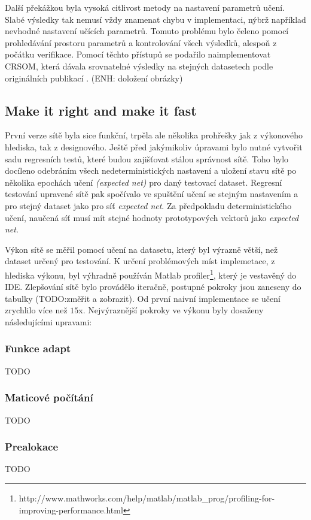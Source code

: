 \documentclass[thesis=M,czech]{FITthesis}[2012/06/26]
\begin{document}
Další překážkou byla vysoká citlivost metody na nastavení parametrů učení\cite{hartono14}. Slabé výsledky tak nemusí vždy znamenat chybu v implementaci, nýbrž například nevhodné nastavení učících parametrů. Tomuto problému bylo čeleno pomocí prohledávání prostoru parametrů a kontrolování všech výsledků, alespoň z počátku verifikace.
Pomocí těchto přístupů se podařilo naimplementovat CRSOM, která dávala srovnatelné výsledky na stejných datasetech podle originálních publikací \cite{hartono14}. (ENH: doložení obrázky)

\subsection{Make it right and make it fast}

První verze sítě byla sice funkční, trpěla ale několika prohřešky jak z výkonového hlediska, tak z designového. Ještě před jakýmikoliv úpravami bylo nutné vytvořit sadu regresních testů, které budou zajišťovat stálou správnost sítě. Toho bylo docíleno odebráním všech nedeterministických nastavení a uložení stavu sítě po několika epochách učení \textit{(expected net)} pro daný testovací dataset.  Regresní testování upravené sítě pak spočívalo ve spuštění učení se stejným nastavením a pro stejný dataset jako pro síť \textit{expected net}. Za předpokladu deterministického učení, naučená síť musí mít stejné hodnoty prototypových vektorů jako \textit{expected net}.

Výkon sítě se měřil pomocí učení na datasetu, který byl výrazně větší, než dataset určený pro testování. K určení problémových míst implemetace, z hlediska výkonu, byl výhradně používán Matlab profiler\footnote{http://www.mathworks.com/help/matlab/matlab\_prog/profiling-for-improving-performance.html}, který je vestavěný do IDE. Zlepšování sítě bylo provádělo iteračně, postupné pokroky jsou zaneseny do tabulky (TODO:změřit a zobrazit). Od první naivní implementace se učení zrychlilo více než $15$x.  Nejvýraznější pokroky ve výkonu byly dosaženy následujícími upravami:


\subsubsection*{Funkce adapt}
TODO
\subsubsection*{Maticové počítání}
TODO
\subsubsection*{Prealokace}
TODO
\end{document}
